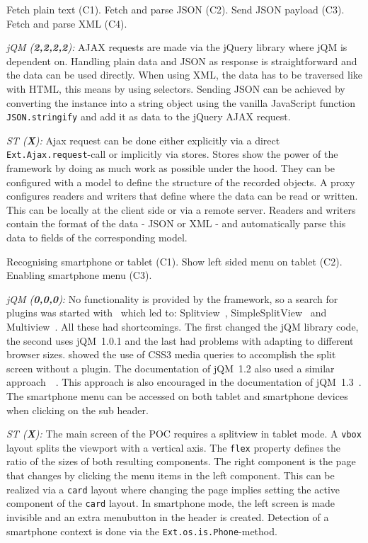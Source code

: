 \documentclass[a4paper]{artikel3}
\newcommand{\code}[1]{\texttt{#1}}
\renewcommand{\paragraph}[1]{\vspace{2mm} \noindent {\bf #1}  }
\newcommand{\framework}[2]{ \emph{#1 (\textbf{#2}): }} %
\newcommand{\challenge}[1]{\paragraph{#1}}
\begin{document}
\challenge{AJAX: text, JSON \& XML}
Fetch plain text (C1).
Fetch and parse JSON (C2).
Send JSON payload (C3).
Fetch and parse XML (C4).

\framework{jQM}{2,2,2,2}
AJAX requests are made via the jQuery library where jQM is dependent on.
Handling plain data and JSON as response is straightforward and the data can be used directly.
When using XML, the data has to be traversed like with HTML, this means by using selectors.
Sending JSON can be achieved by converting the instance into a string object using the vanilla JavaScript function \code{JSON.stringify} and add it as data to the jQuery AJAX request.

\framework{ST}{X}
Ajax request can be done either explicitly via a direct \code{Ext.Ajax.request}-call or implicitly via stores.  Stores show the power of the framework by doing as much work as possible under the hood.  They can be configured with a model to define the structure of the recorded objects.  A proxy configures readers and writers that define where the data can be read or written.  This can be locally at the client side or via a remote server.  Readers and writers contain the format of the data - JSON or XML - and automatically parse this data to fields of the corresponding model. 

\challenge{Device-specific layout (C1,C2,C3)}
Recognising smartphone or tablet (C1).
Show left sided menu on tablet (C2).
Enabling smartphone menu (C3).

\framework{jQM}{0,0,0}
No functionality is provided by the framework, so a search for plugins was started with~\cite{Deering2012} which led to: Splitview~\cite{Rahman2013}, SimpleSplitView~\cite{Yared2013} and Multiview~\cite{Franck2012}. 
All these had shortcomings. The first changed the jQM library code, the second uses jQM~1.0.1 and the last had problems with adapting to different browser sizes.
\cite{Hadlock2012} showed the use of CSS3 media queries to accomplish the split screen without a plugin.
The documentation of jQM~1.2 also used a similar approach~~\cite{JQuery2012b}.
This approach is also encouraged in the documentation of jQM~1.3~\cite{JQuery2013e}.
The smartphone menu can be accessed on both tablet and smartphone devices when clicking on the sub header.

\framework{ST}{X}
The main screen of the POC requires a splitview in tablet mode.  A \code{vbox} layout splits the viewport with a vertical axis.  The \code{flex} property defines the ratio of the sizes of both resulting components.  The right component is the page that changes by clicking the menu items in the left component.  This can be realized via a \code{card} layout where changing the page implies setting the active component of the \code{card} layout.
In smartphone mode,  the left screen is made invisible and an extra menubutton in the header is created.  Detection of a smartphone context is done via the \code{Ext.os.is.Phone}-method.    
\end{document}
